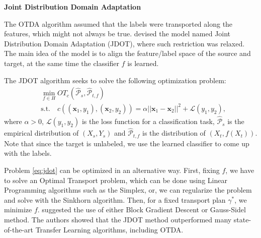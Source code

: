 
\vspace{5mm}
\noindent \textbf{Joint Distribution Domain Adaptation}
\vspace{3mm}

The OTDA algorithm assumed that the labels were transported along the features,
which might not always be true.
\citet{courty17jdot} devised the model named Joint Distribution Domain Adaptation (JDOT),
where such restriction was relaxed.
The main idea of the model is to align the feature/label space of the source and target,
at the same time the classifier $f$ is learned.

The JDOT algorithm seeks to solve the following optimization problem:
\begin{align}
  \nonumber
  &\min_{f \in H} OT_c(\hat{\mathcal P}_s, \hat{\mathcal P}_{t,f}) \\
  &\mathrm{s.t.} \quad 
  c((\mathbf x_1,y_1),(\mathbf x_2, y_2)) = \alpha ||\mathbf x_1 - \mathbf x_2||^2 + \mathcal L(y_1,y_2),
  \label{eq:jdot}
\end{align}
where $\alpha >0$, $\mathcal L(y_1,y_2)$ is the loss function for a classification task,
$\hat{\mathcal P}_s$ is the empirical distribution of $(X_s,Y_s)$ and
$\hat{\mathcal P}_{t,f}$ is the distribution of $(X_t, f(X_t))$. Note that since the target is unlabeled,
we use the learned classifier to come up with the labels.

Problem \eqref{eq:jdot} can be optimized in an alternative way. First, fixing $f$,
we have to solve an Optimal Transport problem, which can be done using Linear Programming
algorithms such as the Simplex, or, we can regularize the problem and solve with
the Sinkhorn algorithm. Then, for a fixed transport plan $\gamma^*$, we minimize $f$.
\citet{courty17jdot} suggested the use of either Block Gradient Descent or Gauss-Sidel method.
The authors showed that the JDOT method outperformed many state-of-the-art Transfer Learning
algorithms, including OTDA.

